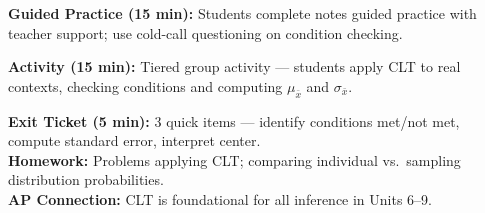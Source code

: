 \documentclass[10pt]{article}
\begin{document}
\begin{practicebox}
\textbf{Guided Practice (15 min):} Students complete notes guided practice with teacher support; use cold-call questioning on condition checking.
\end{practicebox}

\begin{notesbox}
\textbf{Activity (15 min):} Tiered group activity — students apply CLT to real contexts, checking conditions and computing $\mu_{\bar{x}}$ and $\sigma_{\bar{x}}$.
\end{notesbox}

\begin{reflectionbox}
\textbf{Exit Ticket (5 min):} 3 quick items — identify conditions met/not met, compute standard error, interpret center.\\
\textbf{Homework:} Problems applying CLT; comparing individual vs.\ sampling distribution probabilities.\\
\textbf{AP Connection:} CLT is foundational for all inference in Units 6–9.
\end{reflectionbox}
\end{document}
